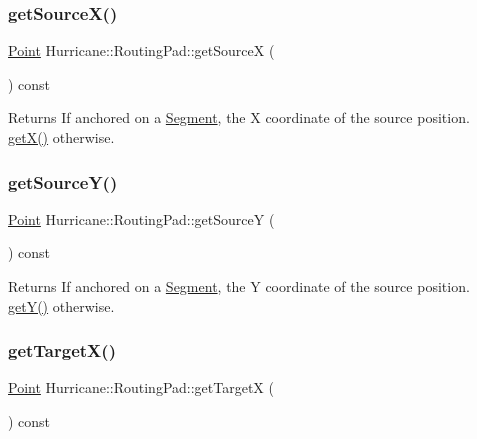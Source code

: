 \subsubsection{\texorpdfstring{get\+Source\+X()}{getSourceX()}}
{\footnotesize\ttfamily \mbox{\hyperlink{classHurricane_1_1Point}{Point}} Hurricane\+::\+Routing\+Pad\+::get\+SourceX (\begin{DoxyParamCaption}{ }\end{DoxyParamCaption}) const}

\begin{DoxyReturn}{Returns}
If anchored on a \mbox{\hyperlink{classHurricane_1_1Segment}{Segment}}, the X coordinate of the source position. \mbox{\hyperlink{classHurricane_1_1RoutingPad_a5c9c00c648bd0d24e1a8b0876ab442df}{get\+X()}} otherwise. 
\end{DoxyReturn}
\mbox{\label{classHurricane_1_1RoutingPad_a75983ff3507f4cbf2aaa4e3132eac987}} 
\subsubsection{\texorpdfstring{get\+Source\+Y()}{getSourceY()}}
{\footnotesize\ttfamily \mbox{\hyperlink{classHurricane_1_1Point}{Point}} Hurricane\+::\+Routing\+Pad\+::get\+SourceY (\begin{DoxyParamCaption}{ }\end{DoxyParamCaption}) const}

\begin{DoxyReturn}{Returns}
If anchored on a \mbox{\hyperlink{classHurricane_1_1Segment}{Segment}}, the Y coordinate of the source position. \mbox{\hyperlink{classHurricane_1_1RoutingPad_aede4c04a7f893b1e5478b164b6eaae2d}{get\+Y()}} otherwise. 
\end{DoxyReturn}
\mbox{\label{classHurricane_1_1RoutingPad_a3c0f5056b20515d308c2945ab692bce5}} 
\subsubsection{\texorpdfstring{get\+Target\+X()}{getTargetX()}}
{\footnotesize\ttfamily \mbox{\hyperlink{classHurricane_1_1Point}{Point}} Hurricane\+::\+Routing\+Pad\+::get\+TargetX (\begin{DoxyParamCaption}{ }\end{DoxyParamCaption}) const}

